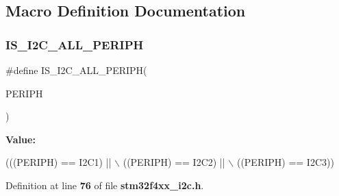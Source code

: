 \subsection{Macro Definition Documentation}
\mbox{\label{group__I2C__Exported__Constants_ga2e57489a40603d6ab7ff115b94eeb303}} 
\subsubsection{I\+S\+\_\+\+I2\+C\+\_\+\+A\+L\+L\+\_\+\+P\+E\+R\+I\+PH}
{\footnotesize\ttfamily \#define I\+S\+\_\+\+I2\+C\+\_\+\+A\+L\+L\+\_\+\+P\+E\+R\+I\+PH(\begin{DoxyParamCaption}\item[{}]{P\+E\+R\+I\+PH }\end{DoxyParamCaption})}

{\bfseries Value\+:}
\begin{DoxyCode}
(((PERIPH) == I2C1) || \(\backslash\)
                                   ((PERIPH) == I2C2) || \(\backslash\)
                                   ((PERIPH) == I2C3))
\end{DoxyCode}


Definition at line \textbf{ 76} of file \textbf{ stm32f4xx\+\_\+i2c.\+h}.

